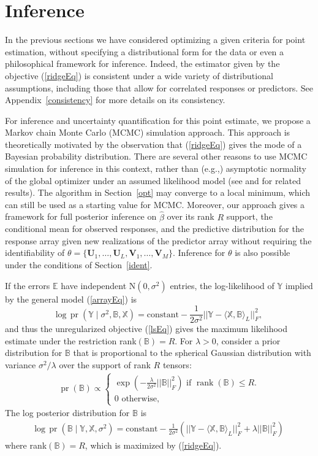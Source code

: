 \documentclass[12pt]{article}
\def\U{\mathbf{U}}
\def\XX{\mathbb{X}}
\def\YY{\mathbb{Y}}
\def\EE{\mathbb{E}}
\def\V{\mathbf{V}}
\def\BB{\mathbb{B}}
\def\log{\mbox{log}}
\newcommand{\tprod}[3] {
  \langle #1, #2 \rangle_{#3}}
\DeclareMathOperator*{\rank}{rank}
\DeclareMathOperator*{\pr}{pr}
\begin{document}
\section{Inference}
\label{inf}

In the previous sections we have considered optimizing a given criteria for point estimation, without specifying a distributional form for the data or even a philosophical framework for inference.  Indeed, the estimator given by the objective (\ref{ridgeEq}) is consistent under a wide variety of distributional assumptions, including those that allow for correlated responses or predictors. See Appendix~\ref{consistency} for more details on its consistency.   

For inference and uncertainty quantification for this point estimate, we propose a Markov chain Monte Carlo (MCMC) simulation approach.  This approach is theoretically motivated by the observation that (\ref{ridgeEq}) gives the mode of a Bayesian probability distribution.  There are several other reasons to use MCMC simulation for inference in this context, rather than (e.g.,) asymptotic normality of the global optimizer under an assumed likelihood model (see \citet{zhou2013tensor} and \citet{zhang2014tensor} for related results).  The algorithm in Section~\ref{opt} may converge to a local minimum, which can still be used as a starting value for MCMC.   Moreover, our approach gives a framework for full posterior inference on $\hat{\beta}$ over its rank $R$ support, the conditional mean for observed responses, and the predictive distribution for the response array given new realizations of the predictor array without requiring the identifiability of $\theta=\{\U_1, \hdots, \U_L, \V_1,\hdots, \V_M\}$. Inference for $\theta$ is also possible under the conditions of Section~\ref{ident}.         

If the errors $\EE$ have independent N$(0,\sigma^2)$ entries, the log-likelihood of $\YY$ implied by the general model (\ref{arrayEq}) is 
\[ \log \, \pr(\YY \mid \sigma^2, \BB, \XX) = \mbox{constant}-\frac{1}{2 \sigma^2} ||\YY- \tprod{\XX}{\BB}{L}||_F^2, \]
and thus the unregularized objective (\ref{lsEq}) gives the maximum likelihood estimate under the restriction rank$(\BB) = R$.  For $\lambda>0$, consider a prior distribution for $\BB$ that is proportional to the spherical Gaussian distribution with variance $\sigma^2/\lambda$ over the support of rank $R$ tensors:
\begin{align}
 \pr(\BB) \propto \begin{cases} \exp \left( -\frac{\lambda}{2\sigma^2} ||\BB||_F^2 \right) \text{ if } \rank(\BB) \leq R. \\ 0 \text{ otherwise,} \end{cases} \label{Bprior}
\end{align}  
The log posterior distribution for $\BB$ is
\begin{align} \log \, \pr(\BB \mid \YY, \XX, \sigma^2) = \mbox{constant}-\frac{1}{2 \sigma^2} \left( ||\YY- \tprod{\XX}{\BB}{L}||_F^2 + \lambda ||\BB||_F^2\right) 
\label{Bpost}	
\end{align}
where rank$(\BB)=R$, which is maximized by (\ref{ridgeEq}).   
\end{document}
